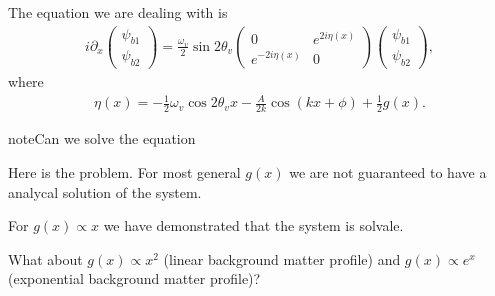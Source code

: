 \documentclass[letterpaper,12pt,english]{sphinxmanual}
\begin{document}
The equation we are dealing with is
\begin{equation*}
\begin{split}i \partial_x  \begin{pmatrix}
\psi_{b1}\\
\psi_{b2}
\end{pmatrix} = \frac{\omega_v}{2} \sin 2\theta_v \begin{pmatrix}
0 & e^{2i\eta(x)} \\
e^{-2i\eta(x)} & 0
\end{pmatrix}\begin{pmatrix}
\psi_{b1}\\
\psi_{b2}
\end{pmatrix},\end{split}
\end{equation*}
where
\begin{equation*}
\begin{split}\eta(x) = - \frac{1}{2} \omega_v \cos 2\theta_v x - \frac{A}{2k} \cos(kx+\phi) + \frac{1}{2} g(x) .\end{split}
\end{equation*}
\begin{sphinxadmonition}{note}{Can we solve the equation}

Here is the problem. For most general \(g(x)\) we are not guaranteed to have a analycal solution of the system.

For \(g(x)\propto x\) we have demonstrated that the system is solvale.

What about \(g(x)\propto x^2\) (linear background matter profile) and \(g(x)\propto e^{x}\) (exponential background matter profile)?
\end{sphinxadmonition}
\end{document}
